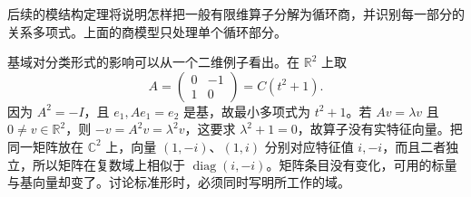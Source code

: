 \ProseParagraphBreak
后续的模结构定理将说明怎样把一般有限维算子分解为循环商，并识别每一部分的关系多项式。上面的商模型只处理单个循环部分。

\ProseParagraphBreak
基域对分类形式的影响可以从一个二维例子看出。在 \(\mathbb R^2\) 上取
\[
	A=\begin{pmatrix}0&-1\\1&0\end{pmatrix}=C(t^2+1).
\]
因为 \(A^2=-I\)，且 \(e_1,Ae_1=e_2\) 是基，故最小多项式为 \(t^2+1\)。若 \(Av=\lambda v\) 且 \(0\ne v\in\mathbb R^2\)，则 \(-v=A^2v=\lambda^2v\)，这要求 \(\lambda^2+1=0\)，故算子没有实特征向量。把同一矩阵放在 \(\mathbb C^2\) 上，向量 \((1,-i)\)、\((1,i)\) 分别对应特征值 \(i,-i\)，而且二者独立，所以矩阵在复数域上相似于 \(\operatorname{diag}(i,-i)\)。矩阵条目没有变化，可用的标量与基向量却变了。讨论标准形时，必须同时写明所工作的域。
